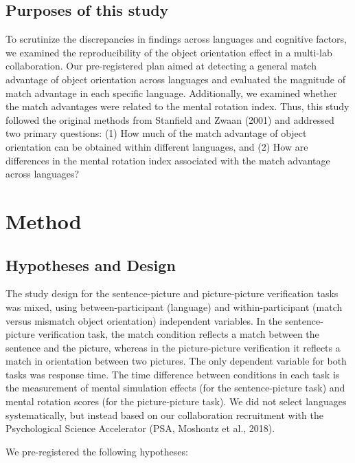 \documentclass[
  man,floatsintext]{apa7}
\begin{document}
\hypertarget{purposes-of-this-study}{%
\subsection{Purposes of this study}\label{purposes-of-this-study}}

To scrutinize the discrepancies in findings across languages and
cognitive factors, we examined the reproducibility of the object
orientation effect in a multi-lab collaboration. Our pre-registered plan
aimed at detecting a general match advantage of object orientation
across languages and evaluated the magnitude of match advantage in each
specific language. Additionally, we examined whether the match
advantages were related to the mental rotation index. Thus, this study
followed the original methods from Stanfield and Zwaan (2001) and addressed
two primary questions: (1) How much of the match advantage of object
orientation can be obtained within different languages, and (2) How are
differences in the mental rotation index associated with the match
advantage across languages?

\hypertarget{method}{%
\section{Method}\label{method}}

\hypertarget{hypotheses-and-design}{%
\subsection{Hypotheses and Design}\label{hypotheses-and-design}}

The study design for the sentence-picture and picture-picture
verification tasks was mixed, using between-participant (language) and
within-participant (match versus mismatch object orientation)
independent variables. In the sentence-picture verification task, the
match condition reflects a match between the sentence and the picture,
whereas in the picture-picture verification it reflects a match in
orientation between two pictures. The only dependent variable for both
tasks was response time. The time difference between conditions in each
task is the measurement of mental simulation effects (for the
sentence-picture task) and mental rotation scores (for the
picture-picture task). We did not select languages systematically, but
instead based on our collaboration recruitment with the Psychological
Science Accelerator (PSA, Moshontz et al., 2018).

We pre-registered the following hypotheses:
\end{document}
